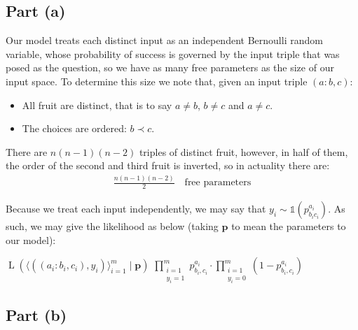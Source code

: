 \subsection{Part (a)}

Our model treats each distinct input as an independent Bernoulli random variable, whose probability of success is governed by the input triple that was posed as the question, so we have as many free parameters as the size of our input space. To determine this size we note that, given an input triple $(a : b, c)$:
\begin{itemize}[-]
\itemsep0em
\item All fruit are distinct, that is to say $a\neq b$, $b\neq c$ and $a\neq c$.
\item The choices are ordered: $b\prec c$.
\end{itemize}

There are $n(n-1)(n-2)$ triples of distinct fruit, however, in half of them, the order of the second and third fruit is inverted, so in actuality there are:
\begin{align*}
  \frac{n(n-1)(n-2)}{2}\quad\text{free parameters}
\end{align*}

Because we treat each input independently, we may say that ${y_i\sim\mathbb{1}(p_{b_ic_i}^{a_i})}$. As such, we may give the likelihood as below (taking $\mathbf{p}$ to mean the parameters to our model):

\begin{itemize}
  \step $\operatorname{L}(\langle((a_i : b_i,c_i),y_i)\rangle_{i=1}^m\mid\mathbf{p})$
  \step[=] $\displaystyle\prod\limits_{\substack{i=1\\y_i=1}}^mp_{b_i,c_i}^{a_i}\cdot\prod_{\substack{i=1\\y_i=0}}^m(1 - p_{b_i,c_i}^{a_i})$
\end{itemize}

\subsection{Part (b)}

